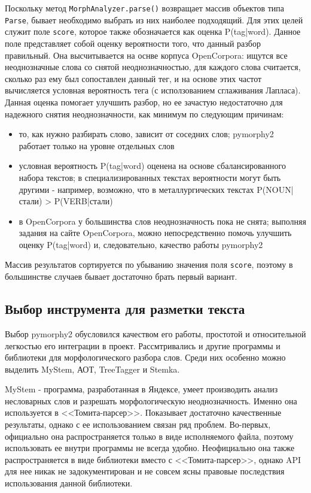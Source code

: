 Поскольку метод \lstinline{MorphAnalyzer.parse()} возвращает массив объектов типа \lstinline{Parse}, бывает необходимо выбрать из них наиболее подходящий. Для этих целей служит поле \lstinline{score}, которое также обозначается как оценка P(tag|word). Данное поле представляет собой оценку вероятности того, что данный разбор правильный. Она высчитывается на оснве корпуса OpenCorpora: ищутся все неоднозначные слова со снятой неоднозначностью, для каждого слова считается, сколько раз ему был сопоставлен данный тег, и на основе этих частот вычисляется условная вероятность тега (с исползованием сглаживания Лапласа). Данная оценка помогает улучшить разбор, но ее зачастую недостаточно для надежного снятия неоднозначности, как минимум по следующим причинам:
\begin{itemize}
  \item то, как нужно разбирать слово, зависит от соседних слов; pymorphy2 работает только на уровне отдельных слов
  \item условная вероятность P(tag|word) оценена на основе сбалансированного набора текстов; в специализированных текстах вероятности могут быть другими - например, возможно, что в металлургических текстах P(NOUN|стали) > P(VERB|стали)
  \item в OpenCorpora у большинства слов неоднозначность пока не снята; выполняя задания на сайте OpenCorpora, можно непосредственно помочь улучшить оценку P(tag|word) и, следовательно, качество работы pymorphy2
\end{itemize}
Массив результатов сортируется по убыванию значения поля \lstinline{score}, поэтому в большинстве случаев бывает достаточно брать первый вариант.

\subsection{Выбор инструмента для разметки текста}
Выбор pymorphy2 обусловился качеством его работы, простотой и относительной легкостью его интеграции в проект. Рассмтривались и другие программы и библиотеки для морфологического разбора слов. Среди них особенно можно выделить MyStem, АОТ, TreeTagger и Stemka. 

MyStem - программа, разработанная в Яндексе, умеет производить анализ несловарных слов и разрешать морфологическую неоднозначность. Именно она используется в <<Томита-парсер>>. Показывает достаточно качественные результаты, однако с ее использованием связан ряд проблем. Во-первых, официально она распространяется только в виде исполняемого файла, поэтому использовать ее внутри программы не всегда удобно. Неофициально она также распространяется в виде библиотеки вместо с <<Томита-парсер>>, однако API для нее никак не задокументирован и не совсем ясны правовые последствия использования данной библиотеки.

